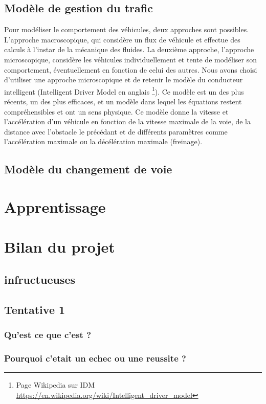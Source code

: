\documentclass[11pt]{article}
\begin{document}
\subsection{Modèle de gestion du trafic}
Pour modéliser le comportement des véhicules, deux approches sont possibles. L’approche macroscopique, qui considère un flux de véhicule et effectue des calculs à l'instar de la mécanique des fluides. La deuxième approche, l'approche microscopique, considère les véhicules individuellement et tente de modéliser son comportement, éventuellement en fonction de celui des autres. 
Nous avons choisi d'utiliser une approche microscopique et de retenir le modèle du conducteur intelligent (Intelligent Driver Model en anglais \footnote{Page Wikipedia sur IDM \url{https://en.wikipedia.org/wiki/Intelligent_driver_model}}). Ce modèle est un des plus récents, un des plus efficaces, et un modèle dans lequel les équations restent compréhensibles et ont un sens physique.
Ce modèle donne la vitesse et l'accélération d'un véhicule en fonction de la vitesse maximale de la voie, de la distance avec l'obstacle le précédant et de différents paramètres comme l'accélération maximale ou la décélération maximale (freinage).

\subsection{Modèle du changement de voie}


\section{Apprentissage}

\section{Bilan du projet}
\subsection{infructueuses}


\subsection{Tentative 1}
\subsubsection{Qu'est ce que c'est ?}
\subsubsection{Pourquoi c'etait un echec ou une reussite ?}
\end{document}

